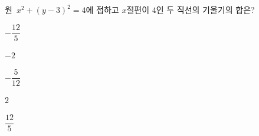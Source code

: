 원~$x^2+(y-3)^2=4$에 접하고 $x$절편이 $4$인 두 직선의 기울기의 합은?
\begin{choices32}{\rule[-3ex]{0pt}{8ex}$-\dfrac{12}{5}$}{\rule[-3ex]{0pt}{8ex}$-2$}{\rule[-3ex]{0pt}{8ex}$-\dfrac{5}{12}$}{\rule[-3ex]{0pt}{8ex}$2$}{\rule[-3ex]{0pt}{8ex}$\dfrac{12}{5}$}\end{choices32}
